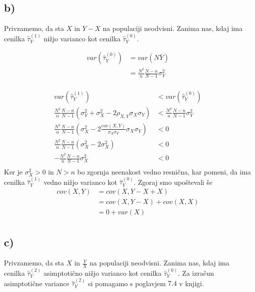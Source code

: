 \documentclass[A4paper, 11pt]{article}
\begin{document}
\subsection*{b)}
Privzamemo, da sta $X$ in $Y - X$ na populaciji neodvisni. Zanima nas, kdaj ima cenilka $\hat{\tau}_Y ^ {(1)}$ nižjo varianco kot cenilka $\hat{\tau}_Y ^ {(0)}$.

\[
\begin{split}
var(\hat{\tau}_Y ^ {(0)}) & = var(N \bar{Y}) \\
                                          & = \frac{N^2}{n} \frac{N - n}{N - 1} \sigma_Y^2
\end{split}
\]
\\
\[
\begin{split}
var(\hat{\tau}_Y ^ {(1)}) & < var(\hat{\tau}_Y ^ {(0)}) \\
 \frac{N^2}{n} \frac{N - n}{N - 1} (\sigma_Y^2 + \sigma_X^2 - 2 \rho_{X,Y} \sigma_X \sigma_Y) & < \frac{N^2}{n} \frac{N - n}{N - 1} \sigma_Y^2 \\
 \frac{N^2}{n} \frac{N - n}{N - 1} ( \sigma_X^2 - 2 \frac{cov(X,Y)}{\sigma_X \sigma_Y} \sigma_X \sigma_Y ) & < 0 \\
 \frac{N^2}{n} \frac{N - n}{N - 1} ( \sigma_X^2 - 2 \sigma_X^2 ) & < 0 \\
 - \frac{N^2}{n} \frac{N - n}{N - 1} \sigma_X^2  & < 0 \\
\end{split}
\]
%
Ker je $\sigma_X^2 > 0$ in $N > n$ bo zgornja neenakost vedno resnična, kar pomeni, da ima cenilka $\hat{\tau}_Y ^ {(1)}$ vedno nižjo varianco kot $\hat{\tau}_Y ^ {(0)}$.
Zgoraj smo upoštevali še
\[
\begin{split}
cov(X, Y) & = cov(X, Y -  X +  X) \\
                & = cov(X, Y -  X) + cov(X, X) \\
                & = 0 + var(X) \\
\end{split}
\]

\subsection*{c)}

Privzamemo, da sta $X$ in $\frac{Y}{X}$ na populaciji neodvisni. Zanima nas, kdaj ima cenilka $\hat{\tau}_Y ^ {(2)}$ asimptotično nižjo varianco kot cenilka $\hat{\tau}_Y ^ {(0)}$. Za izračun asimptotične variance $\hat{\tau}_Y ^ {(2)}$ si pomagamo s poglavjem $7.4$ v knjigi.
\end{document}
